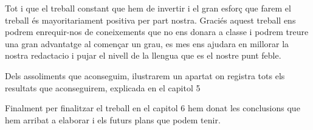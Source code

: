 Tot i que el treball constant que hem de invertir i el gran esforç que farem el treball és mayoritariament positiva per part nostra. Graciés  aquest treball ens podrem enrequir-nos de coneixements que no ens donara a classe i podrem treure una gran advantatge al començar un grau, es mes ens ajudara en millorar la nostra redactacio i pujar el nivell de la llengua que es el nostre punt feble.

Dels assoliments que aconseguim, ilustrarem un apartat on registra tots els resultats que aconseguirem, explicada en el capitol 5 

Finalment per finalitzar el treball en el capitol 6  hem donat les conclusions que hem arribat a elaborar i els futurs plans que podem tenir.


